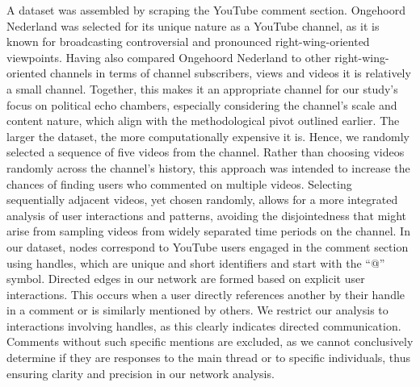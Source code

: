 \documentclass[
  man,floatsintext]{apa6}
\begin{document}
A dataset was assembled by scraping the YouTube comment section. Ongehoord Nederland was selected for its unique nature as a YouTube channel, as it is known for broadcasting controversial and pronounced right-wing-oriented viewpoints. Having also compared Ongehoord Nederland to other right-wing-oriented channels in terms of channel subscribers, views and videos it is relatively a small channel. Together, this makes it an appropriate channel for our study's focus on political echo chambers, especially considering the channel's scale and content nature, which align with the methodological pivot outlined earlier.
The larger the dataset, the more computationally expensive it is. Hence, we randomly selected a sequence of five videos from the channel. Rather than choosing videos randomly across the channel's history, this approach was intended to increase the chances of finding users who commented on
multiple videos. Selecting sequentially adjacent videos, yet chosen randomly, allows for a more integrated analysis of user interactions and patterns, avoiding the disjointedness that might arise from sampling videos from widely separated time periods on the channel.
In our dataset, nodes correspond to YouTube users engaged in the comment section using handles, which are unique and short identifiers and start with the ``@'' symbol. Directed edges in our network are formed based on explicit user interactions. This occurs when a user directly references another by their handle in a comment or is similarly mentioned by others. We restrict our analysis to interactions involving handles, as this clearly indicates directed communication. Comments without such specific mentions are excluded, as we cannot conclusively determine if they are responses to the main thread or to specific individuals, thus ensuring clarity and precision in our network analysis.
\end{document}
